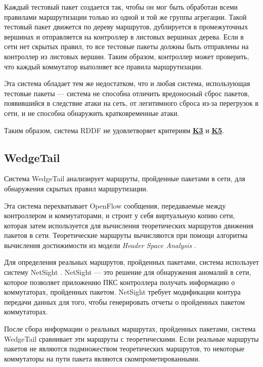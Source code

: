 \documentclass[../thesis.tex]{subfiles}
\begin{document}
Каждый тестовый пакет создается так, чтобы он мог быть обработан всеми правилами маршрутизации только из одной и той же группы агрегации.
Такой тестовый пакет движется по дереву маршрутов, дублируется в промежуточных вершинах и отправляется на контроллер в листовых вершинах дерева.
Если в сети нет скрытых правил, то все тестовые пакеты должны быть отправлены на контроллер из листовых вершин.
Таким образом, контроллер может проверить, что каждый коммутатор выполняет все правила маршрутизации.

Эта система обладает тем же недостатком, что и любая система, использующая тестовые пакеты --- система не способна отличить вредоносный сброс пакетов, появившийся в следствие атаки на сеть, от легитимного сброса из-за перегрузок в сети, и не способна обнаружить кратковременные атаки.

{
\hypersetup{linkcolor=black}

Таким образом, система RDDF не удовлетворяет критериям \hyperref[criterion:K3]{\textbf{K3}} и \hyperref[criterion:K5]{\textbf{K5}}.
}

\subsection{WedgeTail} \label{subsection:wedgetail}

Система WedgeTail \cite{shaghaghi2017wedgetail} анализирует маршруты, пройденные пакетами в сети, для обнаружения скрытых правил маршрутизации.

Эта система перехватывает OpenFlow сообщения, передаваемые между контроллером и коммутаторами, и строит у себя виртуальную копию сети, которая затем используется для вычисления теоретических маршрутов движения пакетов в сети.
Теоретические маршруты вычисляются при помощи алгоритма вычисления достижимости из модели \textit{Header Space Analysis} \cite{kazemian2012header}.

Для определения реальных маршрутов, пройденных пакетами, система использует систему NetSight \cite{handigol2014know}.
NetSight --- это решение для обнаружения аномалий в сети, которое позволяет приложению ПКС контроллера получать информацию о коммутаторах, пройденных пакетом.
NetSight требует модификации контура передачи данных для того, чтобы генерировать отчеты о пройденных пакетом коммутаторах.

После сбора информации о реальных маршрутах, пройденных пакетами, система WedgeTail сравнивает эти маршруты с теоретическими.
Если реальные маршруты пакетов не являются подмножеством теоретических маршрутов, то некоторые коммутаторы на пути пакета являются скомпрометированными.
\end{document}
